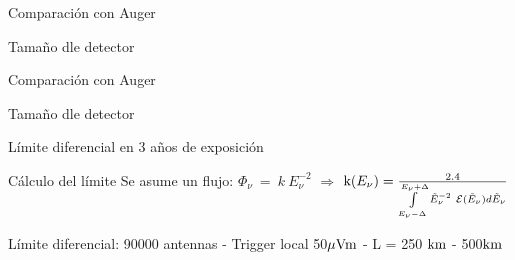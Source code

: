\begin{frame}{Comparaci\'on con Auger}
\footnotesize
	\begin{block}{Tama\~no dle detector}
	\centering
	\end{block}
	
% 		
\end{frame}

\begin{frame}{Comparaci\'on con Auger}
\footnotesize
	\begin{block}{Tama\~no dle detector}
	\centering
	\end{block}
	
% 		
\end{frame}

\begin{frame}{L\'imite diferencial en 3 a\~nos de exposici\'on}

				\begin{alertblock}{\scriptsize C\'alculo del l\'imite}
				\centering
				\scriptsize
				Se asume un flujo: $\Phi_\nu ~ = ~ k ~ E_\nu^{-2}$ $\Rightarrow$ ${\text k (E_\nu)} = \frac{2.4}{\int\limits_{E_\nu-\Delta}^{E_\nu+\Delta} \tilde{E}_{\nu}^{-2}~{\cal E}(\tilde{E}_\nu) d\tilde{E}_\nu}$
			\end{alertblock}
		
		
		\begin{block}{\scriptsize L\'imite diferencial: 90000 antennas - Trigger local 50${\rm \mu Vm}$ - L = 250 ${\rm km}$ - 500${\rm km}$}
			\begin{center}
			\end{center}
		\end{block}
\end{frame}

